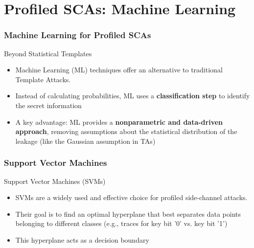 \section{Profiled SCAs: Machine Learning} %

 
\begin{frame}
    \frametitle{Machine Learning for Profiled SCAs}
    \begin{block}{Beyond Statistical Templates}
        \begin{itemize}
            \item Machine Learning (ML) techniques offer an alternative to traditional Template Attacks.
            \item Instead of calculating probabilities, ML uses a \textbf{classification step} to identify the secret information
            \item A key advantage: ML provides a \textbf{nonparametric and data-driven approach}, removing assumptions about the statistical distribution of the leakage (like the Gaussian assumption in TAs)
        \end{itemize}
    \end{block}
\end{frame}
\begin{frame}
\frametitle{Support Vector Machines}
    \begin{block}{Support Vector Machines (SVMs)}
        \begin{itemize}
            \item SVMs are a widely used and effective choice for profiled side-channel attacks.
            \item Their goal is to find an optimal hyperplane that best separates data points belonging to different classes (e.g., traces for key bit '0' vs. key bit '1')
            \item This hyperplane acts as a decision boundary
        \end{itemize}
    \end{block}
\end{frame}

